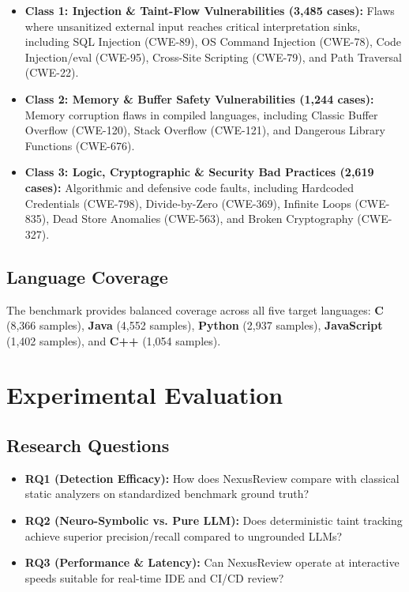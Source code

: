 \documentclass[10pt,conference]{IEEEtran}
\begin{document}
\begin{itemize}
    \item \textbf{Class 1: Injection \& Taint-Flow Vulnerabilities (3{,}485 cases):} Flaws where unsanitized external input reaches critical interpretation sinks, including SQL Injection (CWE-89), OS Command Injection (CWE-78), Code Injection/eval (CWE-95), Cross-Site Scripting (CWE-79), and Path Traversal (CWE-22).
    \item \textbf{Class 2: Memory \& Buffer Safety Vulnerabilities (1{,}244 cases):} Memory corruption flaws in compiled languages, including Classic Buffer Overflow (CWE-120), Stack Overflow (CWE-121), and Dangerous Library Functions (CWE-676).
    \item \textbf{Class 3: Logic, Cryptographic \& Security Bad Practices (2{,}619 cases):} Algorithmic and defensive code faults, including Hardcoded Credentials (CWE-798), Divide-by-Zero (CWE-369), Infinite Loops (CWE-835), Dead Store Anomalies (CWE-563), and Broken Cryptography (CWE-327).
\end{itemize}

\subsection{Language Coverage}
The benchmark provides balanced coverage across all five target languages:
\textbf{C} (8{,}366 samples), \textbf{Java} (4{,}552 samples), \textbf{Python} (2{,}937 samples), \textbf{JavaScript} (1{,}402 samples), and \textbf{C++} (1{,}054 samples).

\section{Experimental Evaluation}

\subsection{Research Questions}
\begin{itemize}
    \item \textbf{RQ1 (Detection Efficacy):} How does NexusReview compare with classical static analyzers on standardized benchmark ground truth?
    \item \textbf{RQ2 (Neuro-Symbolic vs. Pure LLM):} Does deterministic taint tracking achieve superior precision/recall compared to ungrounded LLMs?
    \item \textbf{RQ3 (Performance \& Latency):} Can NexusReview operate at interactive speeds suitable for real-time IDE and CI/CD review?
\end{itemize}
\end{document}

